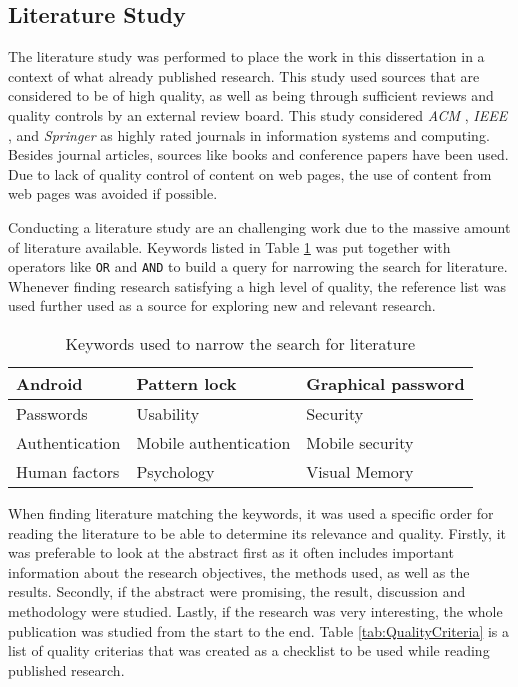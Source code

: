     \subsection{Literature Study}\label{sec:methodliteraturereview}
      The literature study was performed to place the work in this dissertation in a context of what already published research. This study used sources that are considered to be of high quality, as well as being through sufficient reviews and quality controls by an external review board. This study considered {\it ACM} \cite{ACM}, {\it IEEE} \cite{IEEE}, and {\it Springer} \cite{Springer} as highly rated journals in information systems and computing. Besides journal articles, sources like books and conference papers have been used. Due to lack of quality control of content on web pages, the use of content from web pages was avoided if possible.

      Conducting a literature study are an challenging work due to the massive amount of literature available. Keywords listed in Table \ref{tab:keywords} was put together with operators like \texttt{OR} and \texttt{AND} to build a query for narrowing the search for literature. Whenever finding research satisfying a high level of quality, the reference list was used further used as a source for exploring new and relevant research. 

      \begin{table}[H]
          \centering
          \begin{tabular}{| l | l | l |}
            \hline
            Android & Pattern lock & Graphical password \\ \hline
            Passwords & Usability & Security \\ \hline
            Authentication & Mobile authentication & Mobile security \\ \hline
            Human factors & Psychology & Visual Memory \\ \hline
          \end{tabular}
          \caption{Keywords used to narrow the search for literature}
          \label{tab:keywords}
        \end{table}

      When finding literature matching the keywords, it was used a specific order for reading the literature to be able to determine its relevance and quality. Firstly,  it was preferable to look at the abstract first as it often includes important information about the research objectives, the methods used, as well as the results. Secondly, if the abstract were promising, the result, discussion and methodology were studied. Lastly, if the research was very interesting, the whole publication was studied from the start to the end. Table \ref{tab:QualityCriteria} is a list of quality criterias that was created as a checklist to be used while reading published research.

